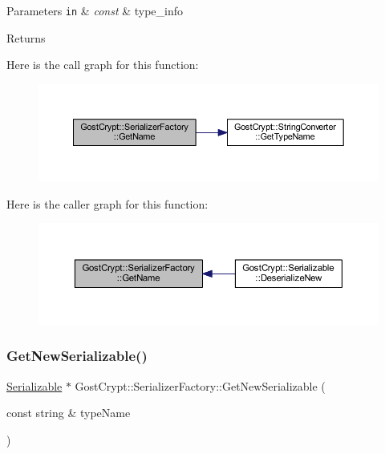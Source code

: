 \begin{DoxyParams}[1]{Parameters}
\mbox{\tt in}  & {\em const} & type\+\_\+info \\
\hline
\end{DoxyParams}
\begin{DoxyReturn}{Returns}

\end{DoxyReturn}
Here is the call graph for this function\+:
\nopagebreak
\begin{figure}[H]
\begin{center}
\leavevmode
\includegraphics[width=350pt]{class_gost_crypt_1_1_serializer_factory_a01d730c850465ebe1d4d08351f755d31_cgraph}
\end{center}
\end{figure}
Here is the caller graph for this function\+:
\nopagebreak
\begin{figure}[H]
\begin{center}
\leavevmode
\includegraphics[width=350pt]{class_gost_crypt_1_1_serializer_factory_a01d730c850465ebe1d4d08351f755d31_icgraph}
\end{center}
\end{figure}
\mbox{\label{class_gost_crypt_1_1_serializer_factory_aa7486ab2f62a5966ceefc529d659fa47}} 
\subsubsection{\texorpdfstring{Get\+New\+Serializable()}{GetNewSerializable()}}
{\footnotesize\ttfamily \hyperlink{class_gost_crypt_1_1_serializable}{Serializable} $\ast$ Gost\+Crypt\+::\+Serializer\+Factory\+::\+Get\+New\+Serializable (\begin{DoxyParamCaption}\item[{const string \&}]{type\+Name }\end{DoxyParamCaption})\hspace{0.3cm}{\ttfamily [static]}}


